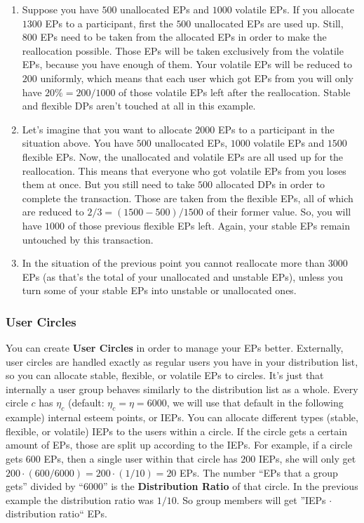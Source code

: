 \documentclass[a4paper,12pt]{scrartcl}
\newcounter{example}
\begin{document}
\begin{enumerate}
 \item Suppose you have $500$ unallocated EPs and $1000$ volatile EPs. If you allocate $1300$ EPs to a participant, first the $500$ unallocated EPs are used up. Still, $800$ EPs need to be taken from the allocated EPs in order to make the reallocation possible. Those EPs will be taken exclusively from the volatile EPs, because you have enough of them. Your volatile EPs will be reduced to $200$ uniformly, which means that each user which got EPs from you will only have $20 \% = 200/1000$ of those volatile EPs left after the reallocation. Stable and flexible DPs aren't touched at all in this example.
 \item Let's imagine that you want to allocate $2000$ EPs to a participant in the situation above. You have $500$ unallocated EPs, $1000$ volatile EPs and $1500$ flexible EPs. Now, the unallocated and volatile EPs are all used up for the reallocation. This means that everyone who got volatile EPs from you loses them at once. But you still need to take $500$ allocated DPs in order to complete the transaction. Those are taken from the flexible EPs, all of which are reduced to $2/3=(1500-500)/1500$ of their former value. So, you will have $1000$ of those previous flexible EPs left. Again, your stable EPs remain untouched by this transaction.
 \item In the situation of the previous point you cannot reallocate more than 3000 EPs (as that's the total of your unallocated and unstable EPs), unless you turn some of your stable EPs into unstable or unallocated ones.  
\end{enumerate}


\subsubsection{User Circles}
You can create \textbf{User Circles} in order to manage your EPs better. Externally, user circles are handled exactly as regular users you have in your distribution list, so you can allocate stable, flexible, or volatile EPs to circles. It's just that internally a user group behaves similarly to the distribution list as a whole. Every circle $c$ has $\eta_c$ (default: $\eta_c = \eta = 6000$, we will use that default in the following example) internal esteem points, or IEPs. You can allocate different types (stable, flexible, or volatile) IEPs to the users within a circle. If the circle gets a certain amount of EPs, those are split up according to the IEPs. For example, if a circle gets $600$ EPs, then a single user within that circle has $200$ IEPs, she will only get $200\cdot(600/6000)=200\cdot(1/10)=20$ EPs. The number ``EPs that a group gets'' divided by ``$6000$'' is the \textbf{Distribution Ratio} of that circle. In the previous example the distribution ratio was $1/10$. So group members will get ''IEPs 
$\cdot$ distribution ratio`` EPs.
\end{document}
